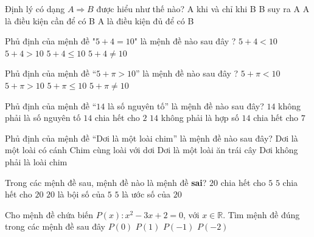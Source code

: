 \begin{ex}
	Định lý có dạng $A\Rightarrow B$ được hiểu như thế nào?
	\choice
	{A khi và chỉ khi B}
	{B suy ra A}
	{A là điều kiện cần để có B}
	{\True A là điều kiện đủ để có B}
\end{ex}

\begin{ex}
	Phủ định của mệnh đề "$5+4=10$" là mệnh đề nào sau đây ?
	\choice
	{$5+4<10$}
	{$5+4>10$}
	{$5+4\le 10$}
	{\True $5+4\ne 10$}
\end{ex}

\begin{ex}
	Phủ định của mệnh đề “$5+\pi >10$” là mệnh đề nào sau đây ?
	\choice
	{$5+\pi <10$}
	{$5+\pi >10$}
	{\True $5+\pi \le 10$}
	{$5+\pi \ne 10$}
\end{ex}

\begin{ex}
	Phủ định của mệnh đề “$14$ là số nguyên tố” là mệnh đề nào sau đây?
	\choice
	{\True $14$ không phải là số nguyên tố}
	{$14$ chia hết cho $2$}
	{$14$ không phải là hợp số}
	{$14$ chia hết cho $7$}
\end{ex}

\begin{ex}
	Phủ định của mệnh đề “Dơi là một loài chim” là mệnh đề nào sau đây?
	\choice
	{Dơi là một loài có cánh}
	{Chim cùng loài với dơi}
	{Dơi là một loài ăn trái cây}
	{\True Dơi không phải là loài chim}
\end{ex}

\begin{ex}
	Trong các mệnh đề sau, mệnh đề nào là mệnh đề \textbf{sai}?
	\choice
	{$20$ chia hết cho $5$}
	{\True $5$ chia hết cho $20$}
	{$20$ là bội số của $5$}
	{$5$ là ước số của $20$}
	\loigiai{
	}
\end{ex}

\begin{ex}
	Cho mệnh đề chứa biến $P\left(x\right):x^2-3x+2=0$, với $x\in \mathbb{R}$. Tìm mệnh đề đúng trong các mệnh đề sau đây
	\choice
	{$P\left(0\right)$}
	{\True $P\left(1\right)$}
	{$P\left(-1\right)$}
	{$P\left(-2\right)$}
\end{ex}

